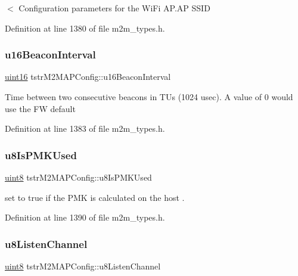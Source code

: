 $<$ Configuration parameters for the Wi\+Fi A\+P.\+AP S\+S\+ID 

Definition at line 1380 of file m2m\+\_\+types.\+h.

\mbox{\label{structtstrM2MAPConfig_ac28eaca963a1872d2d559813d0224ae5}} 
\subsubsection{\texorpdfstring{u16\+Beacon\+Interval}{u16BeaconInterval}}
{\footnotesize\ttfamily \hyperlink{group__DataT_ga1daa745171fc6e31d942c161422a76f9}{uint16} tstr\+M2\+M\+A\+P\+Config\+::u16\+Beacon\+Interval}

Time between two consecutive beacons in T\+Us (1024 usec). A value of 0 would use the FW default 

Definition at line 1383 of file m2m\+\_\+types.\+h.

\mbox{\label{structtstrM2MAPConfig_ad9d4b9a81cf084af4399fb2aa1817554}} 
\subsubsection{\texorpdfstring{u8\+Is\+P\+M\+K\+Used}{u8IsPMKUsed}}
{\footnotesize\ttfamily \hyperlink{group__DataT_ga4df709a77647e870bbf1d955b8edc9a6}{uint8} tstr\+M2\+M\+A\+P\+Config\+::u8\+Is\+P\+M\+K\+Used}

set to true if the P\+MK is calculated on the host . 

Definition at line 1390 of file m2m\+\_\+types.\+h.

\mbox{\label{structtstrM2MAPConfig_a1425d62e5001c25d04d88e20582526e0}} 
\subsubsection{\texorpdfstring{u8\+Listen\+Channel}{u8ListenChannel}}
{\footnotesize\ttfamily \hyperlink{group__DataT_ga4df709a77647e870bbf1d955b8edc9a6}{uint8} tstr\+M2\+M\+A\+P\+Config\+::u8\+Listen\+Channel}

